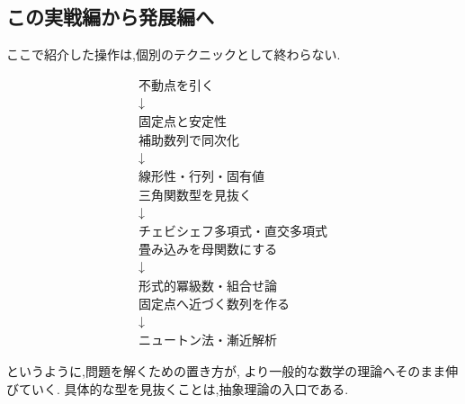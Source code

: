 \subsection{この実戦編から発展編へ}

ここで紹介した操作は,個別のテクニックとして終わらない.

\[
\begin{array}{c}
\text{不動点を引く}\\
\downarrow\\
\text{固定点と安定性}\\[2mm]
\text{補助数列で同次化}\\
\downarrow\\
\text{線形性・行列・固有値}\\[2mm]
\text{三角関数型を見抜く}\\
\downarrow\\
\text{チェビシェフ多項式・直交多項式}\\[2mm]
\text{畳み込みを母関数にする}\\
\downarrow\\
\text{形式的冪級数・組合せ論}\\[2mm]
\text{固定点へ近づく数列を作る}\\
\downarrow\\
\text{ニュートン法・漸近解析}
\end{array}
\]

というように,問題を解くための置き方が,
より一般的な数学の理論へそのまま伸びていく.
具体的な型を見抜くことは,抽象理論の入口である.
